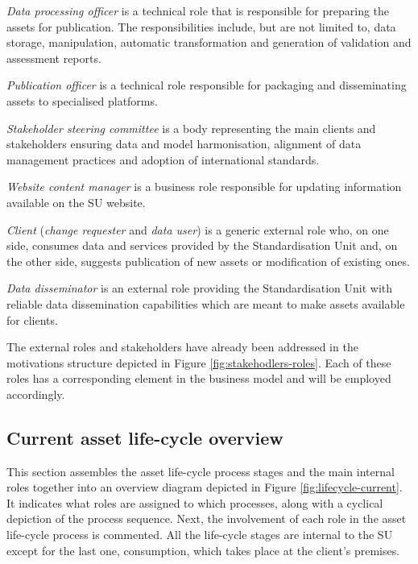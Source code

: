 	\textit{Data processing officer} is a technical role that is responsible for preparing the assets for publication. The responsibilities include, but are not limited to, data storage, manipulation, automatic transformation and generation of validation and assessment reports. 
	
	\textit{Publication officer} is a technical role responsible for packaging and disseminating assets to specialised platforms.
	
	\textit{Stakeholder steering committee} is a body representing the main clients and stakeholders ensuring data and model harmonisation, alignment of data management practices and adoption of international standards.
	
	\textit{Website content manager} is a business role responsible for updating information available on the SU website. 
	
	\textit{Client} (\textit{change requester} and \textit{data user}) is a generic external role who, on one side, consumes data and services provided by the Standardisation Unit and, on the other side, suggests publication of new assets or modification of existing ones. 
	
	\textit{Data disseminator} is an external role providing the Standardisation Unit with reliable data dissemination capabilities which are meant to make assets available for clients.
	
	\enlargethispage{1em}

	The external roles and stakeholders have already been addressed in the motivations structure depicted in Figure \ref{fig:stakehodlers-roles}. Each of these roles has a corresponding element in the business model and will be employed accordingly.

    
	\subsection{Current asset life-cycle overview}
	\label{sec:lifecycle-current}
	
	This section assembles the asset life-cycle process stages and the main internal roles together into an overview diagram depicted in Figure \ref{fig:lifecycle-current}. It indicates what roles are assigned to which processes, along with a cyclical depiction of the process sequence. Next, the involvement of each role in the asset life-cycle process is commented. All the life-cycle stages are internal to the SU except for the last one, consumption, which takes place at the client's premises.
	
